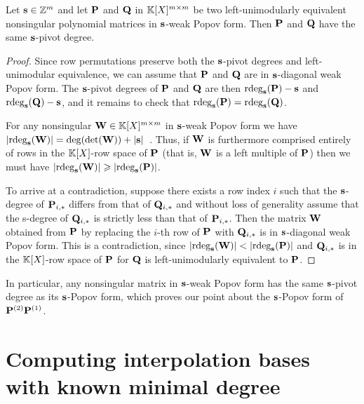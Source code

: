 \documentclass[preprint]{sig-alternate-05-2015}
\begin{document}
\begin{lem}
\label{lem:invariant}
Let $\mathbf{s} \in \mathbb{Z}^{m}$ and let $\mat{P}$ and $\mat{Q}$ in $\intSpace$
be two left-unimodularly equivalent nonsingular polynomial matrices in
$\mathbf{s}$-weak Popov form. Then $\mat{P}$ and $\mat{Q}$ have the same
$\mathbf{s}$-pivot degree.
\end{lem}
\begin{proof}
Since row permutations preserve both the $\mathbf{s}$-pivot degrees and
left-unimodular equivalence, we can assume that $\mat{P}$ and $\mat{Q}$ are in
$\mathbf{s}$-diagonal weak Popov form. The $\mathbf{s}$-pivot degrees of $\mat{P}$
and $\mat{Q}$ are then $\rdeg[\shifts]{\mat{P}} - \shifts$ and
$\rdeg[\shifts]{\mat{Q}} - \shifts$, and it remains to check that
$\rdeg[\shifts]{\mat{P}} = \rdeg[\shifts]{\mat{Q}}$.

For any nonsingular $\mat{W} \in \polMatSpace$ in $\mathbf{s}$-weak Popov form we
have $\sumVec{\rdeg[\shifts]{\mat{W}}} = \deg(\det(\mat{W})) +
\sshifts$~\cite[Section~6.3.2]{Kailath80}. Thus, if $\mat{W}$ is furthermore
comprised entirely of rows in the $\mathbb{K}[X]$-row space of $\mat{P}$ (that is,
$\mat{W}$ is a left multiple of $\mat{P}$) then we must have
$\sumVec{\rdeg[\shifts]{\mat{W}}} \ge \sumVec{\rdeg[\shifts]{\mat{P}}}$.

To arrive at a contradiction, suppose there exists a row index $i$ such that
the $\mathbf{s}$-degree of $\matrow{\mat{P}}{i}$ differs from that of
$\matrow{\mat{Q}}{i}$ and without loss of generality assume that the s-degree
of $\matrow{\mat{Q}}{i}$ is strictly less than that of $\matrow{\mat{P}}{i}$.
Then the matrix $\mat{W}$ obtained from $\mat{P}$ by replacing the $i$-th row
of $\mat{P}$ with $\matrow{\mat{Q}}{i}$ is in $\mathbf{s}$-diagonal weak Popov
form. This is a contradiction, since $\sumVec{\rdeg[\shifts]{\mat{W}}} <
\sumVec{\rdeg[\shifts]{\mat{P}}}$ and $\matrow{\mat{Q}}{i}$ is in the
$\mathbb{K}[X]$-row space of $\mat{P}$ for $\mat{Q}$ is left-unimodularly
equivalent to $\mat{P}$.
\end{proof}

In particular, any nonsingular matrix in $\mathbf{s}$-weak Popov form has the same
$\mathbf{s}$-pivot degree as its $\mathbf{s}$-Popov form, which proves our point
about the $\mathbf{s}$-Popov form of $\intBasis^{(2)} \intBasis^{(1)}$.

\section{Computing interpolation bases with known minimal degree}
\label{sec:known_degrees}
\end{document}
